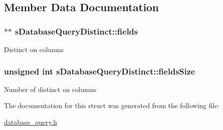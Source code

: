 \subsection{Member Data Documentation}
\subsubsection[{\texorpdfstring{fields}{fields}}]{$\ast$$\ast$ s\+Database\+Query\+Distinct\+::fields}\hypertarget{structsDatabaseQueryDistinct_a78ff1f92d133772c3c310dec754cfa60}{}\label{structsDatabaseQueryDistinct_a78ff1f92d133772c3c310dec754cfa60}
Distinct on columns 
\subsubsection[{\texorpdfstring{fields\+Size}{fieldsSize}}]{\setlength{\rightskip}{0pt plus 5cm}unsigned int s\+Database\+Query\+Distinct\+::fields\+Size}\hypertarget{structsDatabaseQueryDistinct_adefbf680f57431d687f31f2f1a0ba04b}{}\label{structsDatabaseQueryDistinct_adefbf680f57431d687f31f2f1a0ba04b}
Number of distinct on columns 

The documentation for this struct was generated from the following file\+:\begin{DoxyCompactItemize}
\item 
\hyperlink{database__query_8h}{database\+\_\+query.\+h}\end{DoxyCompactItemize}
